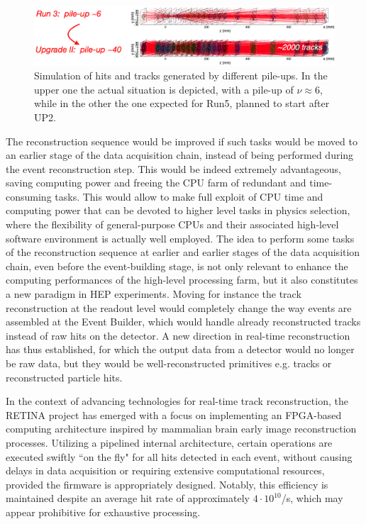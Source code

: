 \begin{figure}
    \centering
    \includegraphics[width=\textwidth]{figures/VELO_pile-up.png}
    \caption{Simulation of hits and tracks generated by different pile-ups. In the upper one the actual situation is depicted, with a pile-up of $\nu\approx 6$, while in the other the one expected for Run5, planned to start after UP2.}
    \label{fig:velo_pile-up}
\end{figure}

The reconstruction sequence would be improved if such tasks would be moved to an earlier stage of the data acquisition chain, instead of being performed during the event reconstruction step. This would be indeed extremely advantageous, saving computing power and freeing the CPU farm of redundant and time-consuming tasks. This would allow to make full exploit of CPU time and computing power that can be devoted to higher level tasks in physics selection, where the flexibility of general-purpose CPUs and their associated high-level software environment is actually well employed.
The idea to perform some tasks of the reconstruction sequence at earlier and earlier stages of the data acquisition chain, even before the event-building stage, is not only relevant to enhance the computing performances of the high-level processing farm, but it also constitutes a new paradigm in HEP experiments. Moving for instance the track reconstruction at the readout level would completely change the way events are assembled at the Event Builder, which would handle already reconstructed tracks instead of raw hits on the detector. A new direction in real-time reconstruction has thus established, for which the output data from a detector would no longer be raw data, but they would be well-reconstructed primitives e.g. tracks or reconstructed particle hits.

In the context of advancing technologies for real-time track reconstruction, the RETINA\cite{refId0} project has emerged with a focus on implementing an FPGA-based computing architecture inspired by  mammalian brain early image reconstruction processes. Utilizing a pipelined internal architecture, certain operations are executed swiftly ``on the fly" for all hits detected in each event, without causing delays in data acquisition or requiring extensive computational resources, provided the firmware is appropriately designed. Notably, this efficiency is maintained despite an average hit rate of approximately $4 \cdot 10^{10}$/s, which may appear prohibitive for exhaustive processing.

